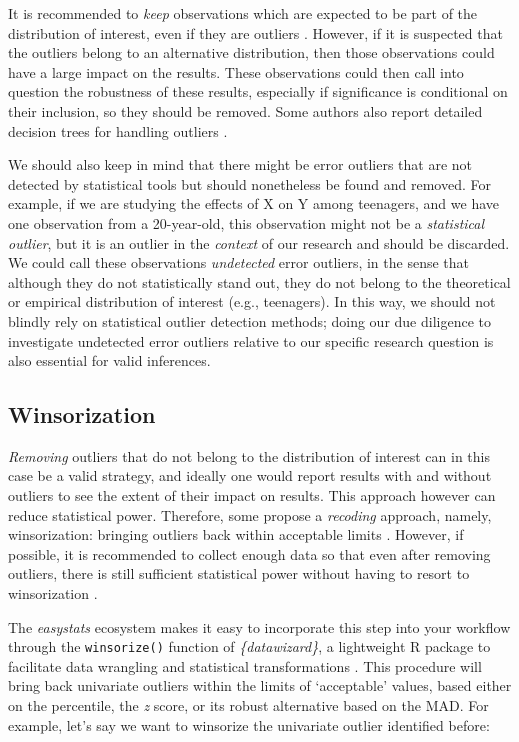 \documentclass[sn-basic, lineno,pdflatex]{sn-jnl}
\begin{document}
It is recommended to \emph{keep} observations which are expected to be
part of the distribution of interest, even if they are outliers
\citep{leys2019outliers}. However, if it is suspected that the outliers
belong to an alternative distribution, then those observations could
have a large impact on the results. These observations could then call
into question the robustness of these results, especially if
significance is conditional on their inclusion, so they should be
removed. Some authors also report detailed decision trees for handling
outliers \citep[e.g., see Figures 1 \& 2 in][]{aguinis2013best}.

We should also keep in mind that there might be error outliers that are
not detected by statistical tools but should nonetheless be found and
removed. For example, if we are studying the effects of X on Y among
teenagers, and we have one observation from a 20-year-old, this
observation might not be a \emph{statistical outlier}, but it is an
outlier in the \emph{context} of our research and should be discarded.
We could call these observations \emph{undetected} error outliers, in
the sense that although they do not statistically stand out, they do not
belong to the theoretical or empirical distribution of interest (e.g.,
teenagers). In this way, we should not blindly rely on statistical
outlier detection methods; doing our due diligence to investigate
undetected error outliers relative to our specific research question is
also essential for valid inferences.

\subsection{Winsorization}\label{winsorization}

\emph{Removing} outliers that do not belong to the distribution of
interest can in this case be a valid strategy, and ideally one would
report results with and without outliers to see the extent of their
impact on results. This approach however can reduce statistical power.
Therefore, some propose a \emph{recoding} approach, namely,
winsorization: bringing outliers back within acceptable limits
\citep[e.g., three MADs,][]{tukey1963less}. However, if possible, it is
recommended to collect enough data so that even after removing outliers,
there is still sufficient statistical power without having to resort to
winsorization \citep{leys2019outliers}.

The \emph{easystats} ecosystem makes it easy to incorporate this step
into your workflow through the \texttt{winsorize()} function of
\emph{\{datawizard\}}, a lightweight R package to facilitate data
wrangling and statistical transformations \citep{patil2022datawizard}.
This procedure will bring back univariate outliers within the limits of
`acceptable' values, based either on the percentile, the \emph{z} score,
or its robust alternative based on the MAD. For example, let's say we
want to winsorize the univariate outlier identified before:
\end{document}
